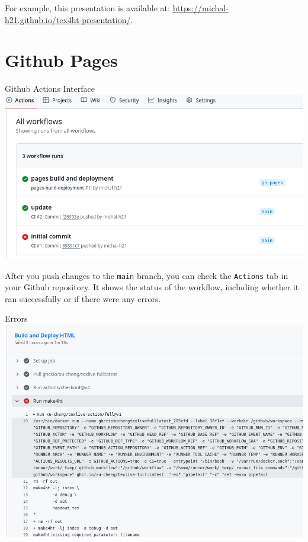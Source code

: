 For example, this presentation is available at: \url{https://michal-h21.github.io/tex4ht-presentation/}.

\section{Github Pages}

\begin{frame}[fragile]{Github Actions Interface}
  \includegraphics[width=\textwidth]{img/github-actions.png}
\end{frame}

After you push changes to the \texttt{main} branch, you can check the \texttt{Actions} tab in your
Github repository. It shows the status of the workflow, including whether it ran successfully or if there were any errors.


\begin{frame}[fragile]{Errors}
  \includegraphics[width=\textwidth]{img/github-error.png}
\end{frame}


